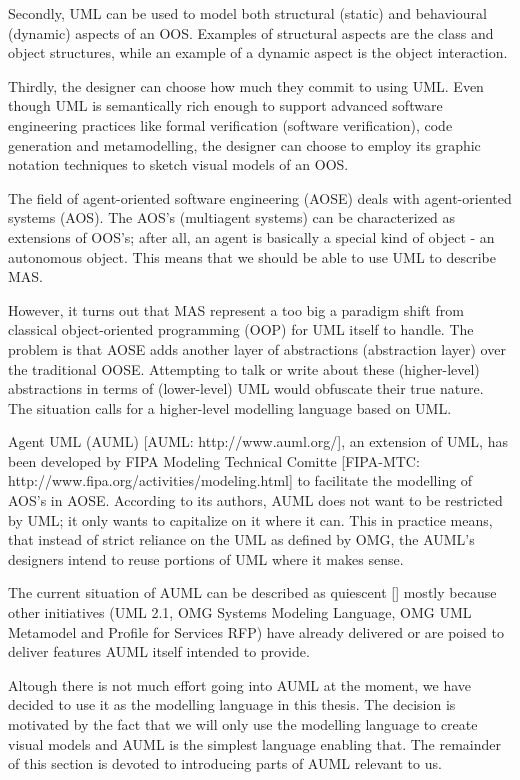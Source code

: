 Secondly, UML can be used to model both structural (static) and behavioural (dynamic) aspects of an OOS.
Examples of structural aspects are the class and object structures, while an example of a dynamic aspect is the object interaction.

Thirdly, the designer can choose how much they commit to using UML.
Even though UML is semantically rich enough to support advanced software engineering practices like formal verification (software verification), code generation and metamodelling, the designer can choose to employ its graphic notation techniques to sketch visual models of an OOS.


The field of agent-oriented software engineering (AOSE) deals with agent-oriented systems (AOS).
The AOS's (multiagent systems) can be characterized as extensions of OOS's; after all, an agent is basically a special kind of object - an autonomous object.
This means that we should be able to use UML to describe MAS.

However, it turns out that MAS represent a too big a paradigm shift from classical object-oriented programming (OOP) for UML itself to handle.
The problem is that AOSE adds another layer of abstractions (abstraction layer) over the traditional OOSE.
Attempting to talk or write about these (higher-level) abstractions in terms of (lower-level) UML would obfuscate their true nature.
The situation calls for a higher-level modelling language based on UML.

Agent UML (AUML) [AUML: http://www.auml.org/], an extension of UML, has been developed by FIPA Modeling Technical Comitte [FIPA-MTC: http://www.fipa.org/activities/modeling.html] to facilitate the modelling of AOS's in AOSE.
According to its authors, AUML does not want to be restricted by UML; it only wants to capitalize on it where it can.
This in practice means, that instead of strict reliance on the UML as defined by OMG, the AUML's designers intend to reuse portions of UML where it makes sense.

The current situation of AUML can be described as quiescent [] mostly because other initiatives (UML 2.1, OMG Systems Modeling Language,  OMG UML Metamodel and Profile for Services RFP) have already delivered or are poised to deliver features AUML itself intended to provide.

Altough there is not much effort going into AUML at the moment, we have decided to use it as the modelling language in this thesis.
The decision is motivated by the fact that we will only use the modelling language to create visual models and AUML is the simplest language enabling that.
The remainder of this section is devoted to introducing parts of AUML relevant to us.

